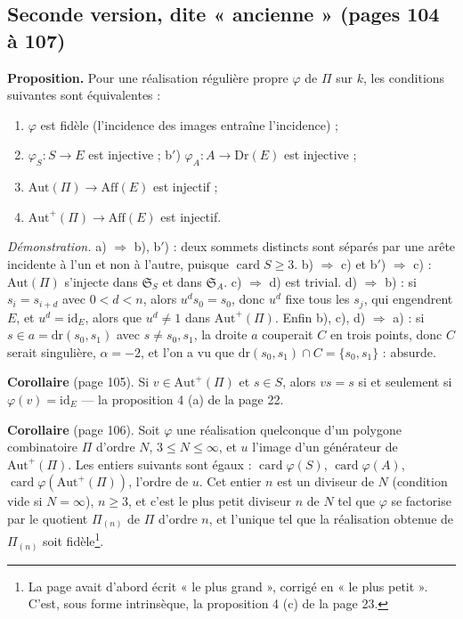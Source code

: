 \documentclass[11pt,a4paper]{article}
\begin{document}
\subsection*{Seconde version, dite « ancienne » (pages 104 à 107)}

\textbf{Proposition.} Pour une réalisation régulière propre $\varphi$ de $\Pi$
sur $k$, les conditions suivantes sont équivalentes :
\begin{enumerate}
  \item[a)] $\varphi$ est fidèle (l'incidence des images entraîne
    l'incidence) ;
  \item[b)] $\varphi_S : S \to E$ est injective ; b$'$) $\varphi_A : A \to
    \mathrm{Dr}(E)$ est injective ;
  \item[c)] $\mathrm{Aut}(\Pi) \to \mathrm{Aff}(E)$ est injectif ;
  \item[d)] $\mathrm{Aut}^{+}(\Pi) \to \mathrm{Aff}(E)$ est injectif.
\end{enumerate}
\emph{Démonstration.} a) $\Rightarrow$ b), b$'$) : deux sommets distincts sont
séparés par une arête incidente à l'un et non à l'autre, puisque
$\operatorname{card} S \geq 3$. b) $\Rightarrow$ c) et b$'$) $\Rightarrow$ c) :
$\mathrm{Aut}(\Pi)$ s'injecte dans $\mathfrak{S}_S$ et dans $\mathfrak{S}_A$.
c) $\Rightarrow$ d) est trivial. d) $\Rightarrow$ b) : si $s_i = s_{i+d}$ avec
$0 < d < n$, alors $u^d s_0 = s_0$, donc $u^d$ fixe tous les $s_j$, qui
engendrent $E$, et $u^d = \mathrm{id}_E$, alors que $u^d \neq 1$ dans
$\mathrm{Aut}^{+}(\Pi)$. Enfin b), c), d) $\Rightarrow$ a) : si $s \in a =
\mathrm{dr}(s_0, s_1)$ avec $s \neq s_0, s_1$, la droite $a$ couperait $C$ en
trois points, donc $C$ serait singulière, $\alpha = -2$, et l'on a vu que
$\mathrm{dr}(s_0, s_1) \cap C = \{s_0, s_1\}$ : absurde.

\textbf{Corollaire} (page 105). Si $v \in \mathrm{Aut}^{+}(\Pi)$ et $s \in
S$, alors $v s = s$ si et seulement si $\varphi(v) = \mathrm{id}_E$ --- la
proposition 4 (a) de la page 22.

\textbf{Corollaire} (page 106). Soit $\varphi$ une réalisation quelconque d'un
polygone combinatoire $\Pi$ d'ordre $N$, $3 \leq N \leq \infty$, et $u$ l'image
d'un générateur de $\mathrm{Aut}^{+}(\Pi)$. Les entiers suivants sont égaux :
$\operatorname{card} \varphi(S)$, $\operatorname{card} \varphi(A)$,
$\operatorname{card} \varphi(\mathrm{Aut}^{+}(\Pi))$, l'ordre de $u$. Cet entier
$n$ est un diviseur de $N$ (condition vide si $N = \infty$), $n \geq 3$, et
c'est le plus petit diviseur $n$ de $N$ tel que $\varphi$ se factorise par le
quotient $\Pi_{(n)}$ de $\Pi$ d'ordre $n$, et l'unique tel que la réalisation
obtenue de $\Pi_{(n)}$ soit fidèle\footnote{La page avait d'abord écrit « le
plus grand », corrigé en « le plus petit ». C'est, sous forme intrinsèque, la
proposition 4 (c) de la page 23.}.
\end{document}
